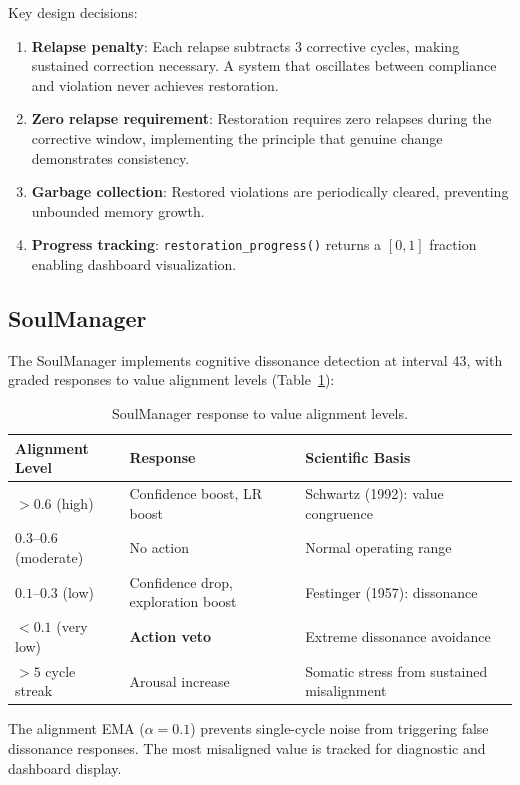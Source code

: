 \documentclass[11pt,a4paper]{article}
\begin{document}
Key design decisions:

\begin{enumerate}
  \item \textbf{Relapse penalty}: Each relapse subtracts 3 corrective cycles, making sustained correction necessary. A system that oscillates between compliance and violation never achieves restoration.
  \item \textbf{Zero relapse requirement}: Restoration requires zero relapses during the corrective window, implementing the principle that genuine change demonstrates consistency.
  \item \textbf{Garbage collection}: Restored violations are periodically cleared, preventing unbounded memory growth.
  \item \textbf{Progress tracking}: \texttt{restoration\_progress()} returns a $[0, 1]$ fraction enabling dashboard visualization.
\end{enumerate}

\subsection{SoulManager}

The SoulManager implements cognitive dissonance detection at interval 43, with graded responses to value alignment levels (Table~\ref{tab:soul_response}):

\begin{table}[h]
\centering
\caption{SoulManager response to value alignment levels.}
\label{tab:soul_response}
\begin{tabular}{lll}
\toprule
\textbf{Alignment Level} & \textbf{Response} & \textbf{Scientific Basis} \\
\midrule
$> 0.6$ (high) & Confidence boost, LR boost & Schwartz (1992): value congruence \\
$0.3$--$0.6$ (moderate) & No action & Normal operating range \\
$0.1$--$0.3$ (low) & Confidence drop, exploration boost & Festinger (1957): dissonance \\
$< 0.1$ (very low) & \textbf{Action veto} & Extreme dissonance avoidance \\
$> 5$ cycle streak & Arousal increase & Somatic stress from sustained misalignment \\
\bottomrule
\end{tabular}
\end{table}

The alignment EMA ($\alpha = 0.1$) prevents single-cycle noise from triggering false dissonance responses. The most misaligned value is tracked for diagnostic and dashboard display.
\end{document}
